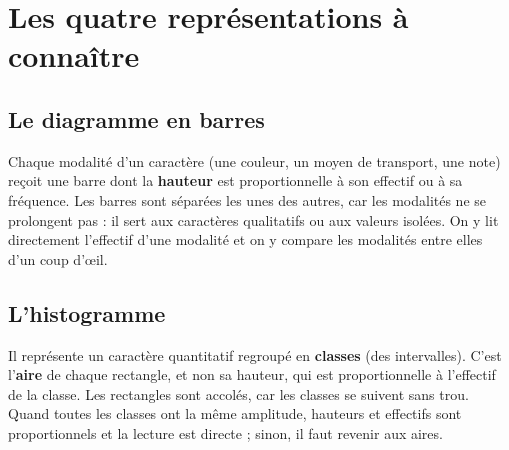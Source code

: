 

\section*{Les quatre représentations à connaître}

\subsection*{Le diagramme en barres}

Chaque modalité d'un caractère (une couleur, un moyen de transport, une note)
reçoit une barre dont la \textbf{hauteur} est proportionnelle à son effectif ou à
sa fréquence. Les barres sont séparées les unes des autres, car les modalités ne
se prolongent pas : il sert aux caractères qualitatifs ou aux valeurs isolées. On
y lit directement l'effectif d'une modalité et on y compare les modalités entre
elles d'un coup d'\oe il.

\subsection*{L'histogramme}

Il représente un caractère quantitatif regroupé en \textbf{classes} (des
intervalles). C'est l'\textbf{aire} de chaque rectangle, et non sa hauteur, qui
est proportionnelle à l'effectif de la classe. Les rectangles sont accolés, car
les classes se suivent sans trou. Quand toutes les classes ont la même amplitude,
hauteurs et effectifs sont proportionnels et la lecture est directe ; sinon, il
faut revenir aux aires.

